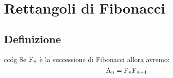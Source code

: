 \chapter{Rettangoli di Fibonacci}
\section{Definizione}
\begin{defn}
ccdg
	Se $\mathrm{F}_{n}$ è la successione di Fibonacci allora avremo:
	\begin{equation}
		\mathrm{A}_{n}=\mathrm{F}_{n}\mathrm{F}_{n+1}
	\end{equation}	
\end{defn}